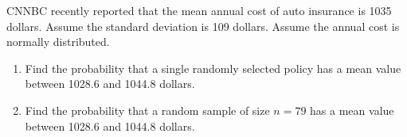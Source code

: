 \begin{exercise}

CNNBC recently reported that the mean annual cost of auto insurance is
1035 dollars. Assume the standard deviation is 109 dollars. Assume the annual cost is normally distributed.

\begin{enumerate}
\item
  Find the probability that a single randomly selected policy has a mean
  value between 1028.6 and 1044.8 dollars.
\item
  Find the probability that a random sample of size \(n=79\) has a mean
  value between 1028.6 and 1044.8 dollars.
\end{enumerate}

\end{exercise}

